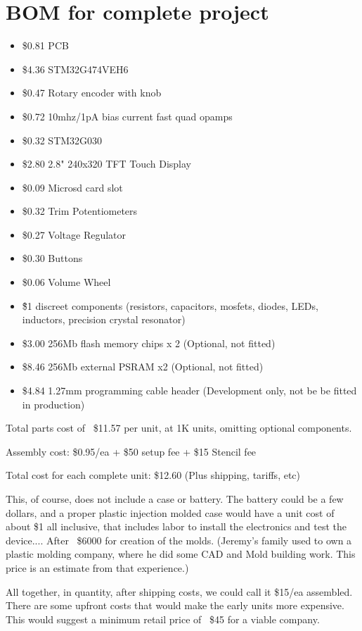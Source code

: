 \section{BOM for complete project}
\begin{itemize}
	\item \$0.81 PCB
	\item \$4.36 STM32G474VEH6
	\item \$0.47 Rotary encoder with knob
	\item \$0.72 10mhz/1pA bias current fast quad opamps
	\item \$0.32 STM32G030
	\item \$2.80 2.8" 240x320 TFT Touch Display
	\item \$0.09 Microsd card slot
	\item \$0.32 Trim Potentiometers
	\item \$0.27 Voltage Regulator
	\item \$0.30 Buttons
	\item \$0.06 Volume Wheel
	\item \~\$1 discreet components (resistors, capacitors, mosfets, diodes, LEDs, inductors, precision crystal resonator)
	\item \$3.00 256Mb flash memory chips x 2 (Optional, not fitted)
	\item \$8.46 256Mb external PSRAM x2 (Optional, not fitted)
	\item \$4.84 1.27mm programming cable header (Development only, not be be fitted in production)
\end{itemize}

Total parts cost of ~\$11.57 per unit, at 1K units, omitting optional components.

Assembly cost: \$0.95/ea + \$50 setup fee + \$15 Stencil fee

Total cost for each complete unit: \$12.60
(Plus shipping, tariffs, etc)

This, of course, does not include a case or battery. The battery could be a few dollars, and a proper plastic injection molded case would have a unit cost of about \$1 all inclusive, that includes labor to install the electronics and test the device.... After ~\$6000 for creation of the molds. (Jeremy's family used to own a plastic molding company, where he did some CAD and Mold building work. This price is an estimate from that experience.)

All together, in quantity, after shipping costs, we could call it \$15/ea assembled. There are some upfront costs that would make the early units more expensive. This would suggest a minimum retail price of ~\$45 for a viable company.


